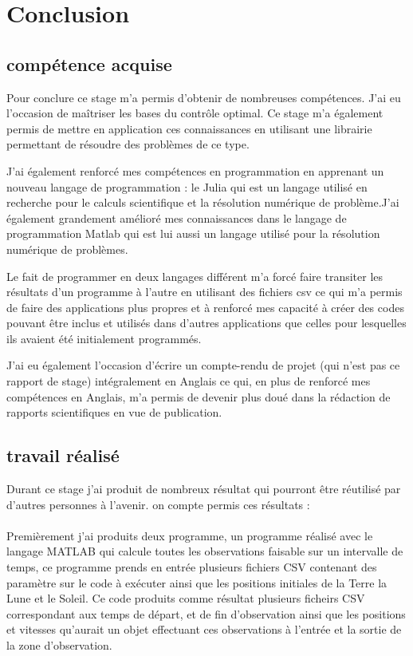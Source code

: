 \documentclass[12pt]{article} %
\begin{document}
		\newpage
		\section{Conclusion}
		\subsection{compétence acquise}
		Pour conclure ce stage m'a permis d'obtenir de nombreuses compétences.
		 J'ai eu l'occasion de maîtriser les bases du contrôle optimal. Ce stage m'a également permis de mettre en application ces connaissances en utilisant une librairie permettant de résoudre des problèmes de ce type.
		
		J'ai également renforcé mes compétences en programmation en apprenant un nouveau langage de programmation : le Julia qui est un langage utilisé en recherche pour le calculs scientifique et la résolution numérique de problème.J'ai également grandement amélioré mes connaissances dans le langage de programmation Matlab qui est lui aussi un langage utilisé pour la résolution numérique de problèmes.
		
		Le fait de programmer en deux langages différent m'a forcé faire transiter les résultats d'un programme à l'autre en utilisant des fichiers csv ce qui m'a permis de faire des applications plus propres et à renforcé mes capacité à créer des codes pouvant être inclus et utilisés dans d'autres applications que celles pour lesquelles ils avaient été initialement programmés.
		
		J'ai eu également l'occasion d'écrire un compte-rendu de projet (qui n'est pas ce rapport de stage) intégralement en Anglais ce qui, en plus de renforcé mes compétences en Anglais, m'a permis de devenir plus doué dans la rédaction de rapports scientifiques en vue de publication.
		
		\subsection{travail réalisé}
		
		Durant ce stage j'ai produit de nombreux résultat qui pourront être réutilisé par d'autres personnes à l'avenir. on compte permis ces résultats : 
		\\ \\
		Premièrement j'ai produits deux programme, un programme réalisé avec le langage MATLAB qui calcule toutes les observations faisable sur un intervalle de temps, ce programme prends en entrée plusieurs fichiers CSV contenant des paramètre sur le code à exécuter ainsi que les positions initiales de la Terre la Lune et le Soleil. Ce code produits comme résultat plusieurs ficheirs CSV correspondant aux temps de départ, et de fin d'observation ainsi que les positions et vitesses qu'aurait un objet effectuant ces observations à l'entrée et la sortie de la zone d'observation.
		
\end{document}
